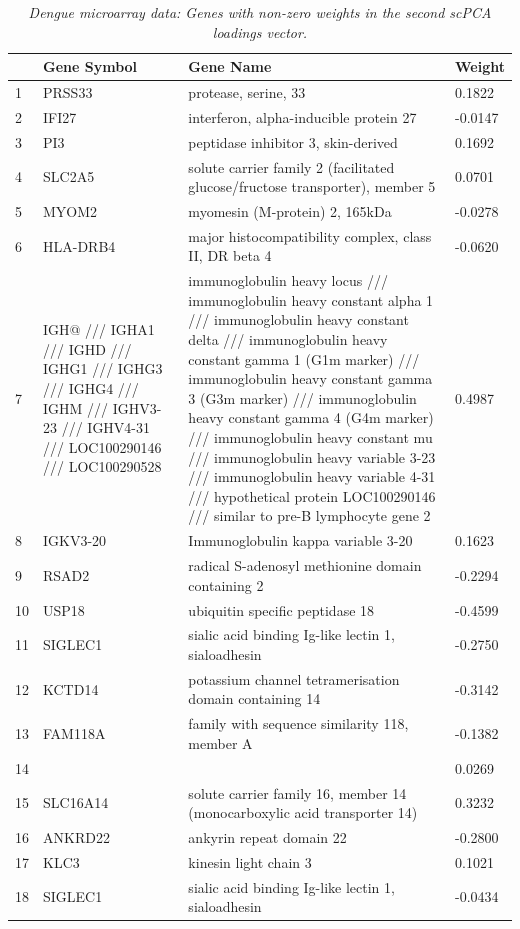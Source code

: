 \begin{longtable}{| l | p{4cm} | p{8cm} | l |}
  \caption{{\em Dengue microarray data: Genes with non-zero weights in the second scPCA loadings vector.}}  \label{tab:dengue_2} \\
  \hline
 & Gene Symbol & Gene Name & Weight \\ 
  \hline
  \endhead
  1 & PRSS33 & protease, serine, 33 & 0.1822 \\ 
  2 & IFI27 & interferon, alpha-inducible protein 27 & -0.0147 \\ 
  3 & PI3 & peptidase inhibitor 3, skin-derived & 0.1692 \\ 
  4 & SLC2A5 & solute carrier family 2 (facilitated glucose/fructose transporter), member 5 & 0.0701 \\ 
  5 & MYOM2 & myomesin (M-protein) 2, 165kDa & -0.0278 \\ 
  6 & HLA-DRB4 & major histocompatibility complex, class II, DR beta 4 & -0.0620 \\ 
  7 & IGH@ /// IGHA1 /// IGHD /// IGHG1 /// IGHG3 /// IGHG4 /// IGHM /// IGHV3-23 /// IGHV4-31 /// LOC100290146 /// LOC100290528 & immunoglobulin heavy locus /// immunoglobulin heavy constant alpha 1 /// immunoglobulin heavy constant delta /// immunoglobulin heavy constant gamma 1 (G1m marker) /// immunoglobulin heavy constant gamma 3 (G3m marker) /// immunoglobulin heavy constant gamma 4 (G4m marker) /// immunoglobulin heavy constant mu /// immunoglobulin heavy variable 3-23 /// immunoglobulin heavy variable 4-31 /// hypothetical protein LOC100290146 /// similar to pre-B lymphocyte gene 2 & 0.4987 \\ 
  8 & IGKV3-20 & Immunoglobulin kappa variable 3-20 & 0.1623 \\ 
  9 & RSAD2 & radical S-adenosyl methionine domain containing 2 & -0.2294 \\ 
  10 & USP18 & ubiquitin specific peptidase 18 & -0.4599 \\ 
  11 & SIGLEC1 & sialic acid binding Ig-like lectin 1, sialoadhesin & -0.2750 \\ 
  12 & KCTD14 & potassium channel tetramerisation domain containing 14 & -0.3142 \\ 
  13 & FAM118A & family with sequence similarity 118, member A & -0.1382 \\ 
  14 &  &  & 0.0269 \\ 
  15 & SLC16A14 & solute carrier family 16, member 14 (monocarboxylic acid transporter 14) & 0.3232 \\ 
  16 & ANKRD22 & ankyrin repeat domain 22 & -0.2800 \\ 
  17 & KLC3 & kinesin light chain 3 & 0.1021 \\ 
  18 & SIGLEC1 & sialic acid binding Ig-like lectin 1, sialoadhesin & -0.0434 \\ 
   \hline
\end{longtable}

